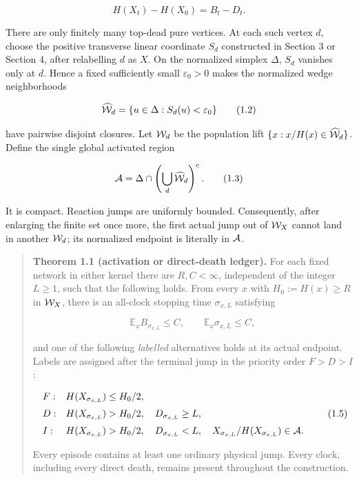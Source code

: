 \[
                         H(X_t)-H(X_0)=B_t-D_t.       \tag{1.1}
\]

There are only finitely many top-dead pure vertices. At each such vertex
\(d\), choose the positive transverse linear coordinate \(S_d\)
constructed in Section 3 or Section 4, after relabelling \(d\) as \(X\).
On the normalized simplex \(\Delta\), \(S_d\) vanishes only at \(d\).
Hence a fixed sufficiently small \(\varepsilon_0>0\) makes the
normalized wedge neighborhoods

\[
 \widehat{\cal W}_d
   =\{u\in\Delta:S_d(u)<\varepsilon_0\}                \tag{1.2}
\]

have pairwise disjoint closures. Let \({\cal W}_d\) be the population
lift \(\{x:x/H(x)\in\widehat{\cal W}_d\}\). Define the single global
activated region

\[
 {\cal A}=\Delta\cap
   \left(\bigcup_d\widehat{\cal W}_d\right)^{\mathrm c}.              \tag{1.3}
\]

It is compact. Reaction jumps are uniformly bounded. Consequently, after
enlarging the finite set once more, the first actual jump out of
\({\cal W}_X\) cannot land in another \({\cal W}_d\); its normalized
endpoint is literally in \({\cal A}\).

\begin{quote}
\textbf{Theorem 1.1 (activation or direct-death ledger).} For each fixed
network in either kernel there are \(R,C<\infty\), independent of the
integer \(L\ge1\), such that the following holds. From every \(x\) with
\(H_0:=H(x)\ge R\) in \({\cal W}_X\), there is an all-clock stopping
time \(\sigma_{x,L}\) satisfying

\[
 \mathbb E_x B_{\sigma_{x,L}}\le C,
 \qquad \mathbb E_x\sigma_{x,L}\le C,                \tag{1.4}
\]

and one of the following \emph{labelled} alternatives holds at its
actual endpoint. Labels are assigned after the terminal jump in the
priority order \(F>D>I\):

\[
\begin{array}{ll}
F:&H(X_{\sigma_{x,L}})\le H_0/2,\\[2mm]
D:&H(X_{\sigma_{x,L}})>H_0/2,\quad
      D_{\sigma_{x,L}}\ge L,\\[2mm]
I:&H(X_{\sigma_{x,L}})>H_0/2,\quad
      D_{\sigma_{x,L}}<L,\quad
      X_{\sigma_{x,L}}/H(X_{\sigma_{x,L}})\in{\cal A}.
\end{array}                                           \tag{1.5}
\]

Every episode contains at least one ordinary physical jump. Every clock,
including every direct death, remains present throughout the
construction.
\end{quote}

